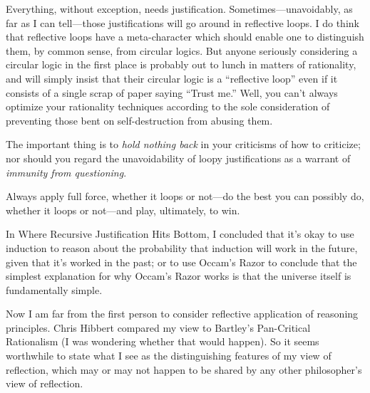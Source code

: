 {
 Everything, without exception, needs justification.
Sometimes---unavoidably, as far as I can tell---those justifications
will go around in reflective loops. I do think that reflective loops
have a meta-character which should enable one to distinguish them, by
common sense, from circular logics. But anyone seriously considering a
circular logic in the first place is probably out to lunch in matters
of rationality, and will simply insist that their circular logic is a
``reflective loop'' even if it
consists of a single scrap of paper saying ``Trust
me.'' Well, you can't always optimize
your rationality techniques according to the sole consideration of
preventing those bent on self-destruction from abusing them.}

{
 The important thing is to \textit{hold nothing back} in your
criticisms of how to criticize; nor should you regard the
unavoidability of loopy justifications as a warrant of \textit{immunity
from questioning}.}

{
 Always apply full force, whether it loops or not---do the best you
can possibly do, whether it loops or not---and play, ultimately, to
win.}

\myendsectiontext


{
 In Where Recursive Justification Hits Bottom, I concluded that
it's okay to use induction to reason about the
probability that induction will work in the future, given that
it's worked in the past; or to use
Occam's Razor to conclude that the simplest explanation
for why Occam's Razor works is that the universe itself
is fundamentally simple. }

{
 Now I am far from the first person to consider reflective
application of reasoning principles. Chris Hibbert compared my view to
Bartley's Pan-Critical Rationalism (I was wondering
whether that would happen). So it seems worthwhile to state what I see
as the distinguishing features of my view of reflection, which may or
may not happen to be shared by any other philosopher's
view of reflection.}

